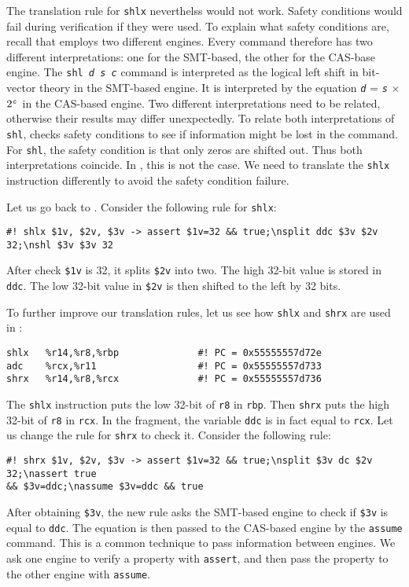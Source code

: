 \documentclass{amsproc}
\begin{document}
The translation rule for \texttt{shlx} neverthelss would not
work. Safety conditions would fail during verification if they were
used. To explain what safety conditions are, recall that \cryptoline
employs two different engines. Every \cryptoline command therefore has
two different interpretations: one for the SMT-based, the other for
the CAS-base engine. The \texttt{shl \textit{d} \textit{s} \textit{c}}
command is interpreted as the logical left shift in bit-vector theory
in the SMT-based engine. It is interpreted by the equation 
\texttt{\textit{d}} = \texttt{\textit{s}} $\times$
$2^{\texttt{\textit{c}}}$ in the CAS-based engine. Two different
interpretations need to be related, otherwise their results may differ
unexpectedly. To relate both interpretations of \texttt{shl},
\cryptoline checks safety conditions to see if information
might be lost in the command. For \texttt{shl}, the safety condition
is that only zeros are shifted out. Thus both interpretations
coincide. In \nistzmul, this is not the case. We need to translate the
\xeightysix \texttt{shlx} instruction differently to avoid the safety
condition failure.

Let us go back to \nistzmulgas. Consider the following rule for
\texttt{shlx}:
\begin{verbatim}
#! shlx $1v, $2v, $3v -> assert $1v=32 && true;\nsplit ddc $3v $2v 32;\nshl $3v $3v 32
\end{verbatim}
After check \texttt{\$1v} is 32, it splits \texttt{\$2v} into two. The
high 32-bit value is stored in \texttt{ddc}. The low 32-bit value in
\texttt{\$2v} is then shifted to the left by 32 bits. 

To further improve our translation rules, let us see how \texttt{shlx}
and \texttt{shrx} are used in \nistzmulgas:
\begin{verbatim}
shlx   %r14,%r8,%rbp              #! PC = 0x55555557d72e
adc    %rcx,%r11                  #! PC = 0x55555557d733
shrx   %r14,%r8,%rcx              #! PC = 0x55555557d736
\end{verbatim}
The \texttt{shlx} instruction puts the low 32-bit of \texttt{r8} in
\texttt{rbp}. Then \texttt{shrx} puts the high 32-bit of \texttt{r8}
in \texttt{rcx}. In the \cryptoline fragment, the variable
\texttt{ddc} is in fact equal to \texttt{rcx}. Let us change the rule
for \texttt{shrx} to check it. Consider the following rule:
\begin{verbatim}
#! shrx $1v, $2v, $3v -> assert $1v=32 && true;\nsplit $3v dc $2v 32;\nassert true 
&& $3v=ddc;\nassume $3v=ddc && true
\end{verbatim}
After obtaining \texttt{\$3v}, the new rule asks the SMT-based engine
to check if \texttt{\$3v} is equal to \texttt{ddc}. The equation is
then passed to the CAS-based engine by the \cryptoline \texttt{assume}
command. This is a common technique to pass information between
engines. We ask one engine to verify a property with \texttt{assert},
and then pass the property to the other engine with \texttt{assume}.
\end{document}
